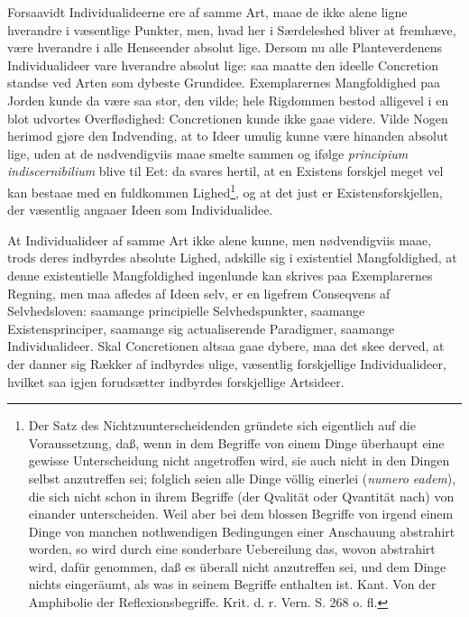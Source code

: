 \documentclass[11pt]{book}
\newcommand{\opage}[1]{\marginnote{\footnotesize\textit{[#1]}}}
\begin{document}
Forsaavidt Individualideerne ere af samme Art, maae de ikke alene
ligne hverandre i væsentlige Punkter, men, hvad her i Særdeleshed
bliver at fremhæve, være hverandre i alle Henseender absolut lige.
Dersom nu alle Planteverdenens Individualideer vare hverandre absolut
lige: saa maatte den ideelle Concretion standse ved Arten som dybeste
Grundidee. Exemplarernes Mangfoldighed paa Jorden kunde da være
saa stor, den vilde; hele Rigdommen bestod alligevel i en blot
udvortes Overflødighed: Concretionen kunde ikke gaae videre. Vilde
Nogen herimod gjøre den Indvending, at to Ideer umulig kunne være
hinanden absolut lige, uden at de nødvendigviis maae smelte sammen
og ifølge \textit{principium indiscernibilium} blive til Eet: da svares
hertil, at en Existens\-%
forskjel meget vel kan bestaae med en fuldkommen
Lighed\footnote{Der Satz des Nichtzuunterscheidenden gründete sich
eigentlich auf die Voraussetzung, daß, wenn in dem Begriffe von einem
Dinge überhaupt eine gewisse Unterscheidung nicht angetroffen wird,
sie auch nicht in den Dingen selbst anzutreffen sei; folglich seien alle
Dinge völlig einerlei (\textit{numero eadem}), die sich nicht schon in
ihrem Begriffe (der Qvalität oder Qvantität nach) von einander
unterscheiden. Weil aber bei dem blossen Begriffe von irgend einem
Dinge von manchen nothwendigen Bedingungen einer Anschauung
abstrahirt worden, so wird durch eine sonderbare Uebereilung das,
wovon abstrahirt wird, dafür genommen, daß es überall nicht
anzutreffen sei, und dem Dinge nichts eingeräumt, als was in seinem
Begriffe enthalten ist. Kant. Von der Amphibolie der
Reflexionsbegriffe. Krit. d. r. Vern. S. 268 o. fl.},
\opage{324} \setcounter{footnote}{0}%
og at det just er Existensforskjellen, der væsentlig angaaer Ideen som
Individualidee.

At Individualideer af samme Art ikke alene kunne, men
nødvendigviis maae, trods deres indbyrdes absolute Lighed, adskille sig
i existentiel Mangfoldighed, at denne existentielle Mangfoldighed
ingenlunde kan skrives paa Exemplarernes Regning, men maa afledes
af Ideen selv, er en ligefrem Conseqvens af Selvhedsloven: saamange
principielle Selvhedspunkter, saamange Existensprinciper, saamange sig
actualiserende Paradigmer, saamange Individualideer. Skal
Concretionen altsaa gaae dybere, maa det skee derved, at der danner
sig Rækker af indbyrdes ulige, væsentlig forskjellige Individualideer,
hvilket saa igjen forudsætter indbyrdes forskjellige Artsideer.
\end{document}
